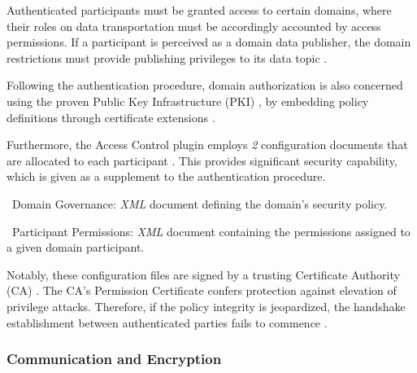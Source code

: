 Authenticated participants must be granted access to certain domains, where their roles on data transportation must be accordingly accounted by access permissions. If a participant is perceived as a domain data publisher, the domain restrictions must provide publishing privileges to its data topic \cite{white2019network}. 

Following the authentication procedure, domain authorization is also concerned using the proven Public Key Infrastructure (PKI) \cite{ros-dds-integration}, by embedding policy definitions through certificate extensions \cite{white2016sros}. 

Furthermore, the Access Control plugin employs \textit{2} configuration documents that are allocated to each participant \cite{white2019network}. This provides significant security capability, which is given as a supplement to the authentication procedure.

\textbullet\ Domain Governance: \textit{XML} document defining the domain's security policy.

\textbullet\ Participant Permissions: \textit{XML} document containing the permissions assigned to a given domain participant.

Notably, these configuration files are signed by a trusting Certificate Authority (CA) \cite{ros-dds-integration}. The CA's Permission Certificate confers protection against elevation of privilege attacks. Therefore, if the policy integrity is jeopardized, the handshake establishment between authenticated parties fails to commence \cite{white2016sros}.

\subsubsection{Communication and Encryption}



